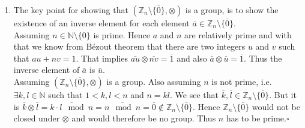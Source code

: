 \documentclass[solution]{tudexercise}
\newcommand{\qed}{\hspace*{\fill}$\square$}
\begin{document}
\begin{enumerate}
				\item
				The key point for showing that $(\mathbb{Z}_n \setminus \{\overline{0}\}, \otimes)$ is a group, is to show the existence of an inverse element for each element $\overline{a} \in \mathbb{Z}_n \setminus \{\overline{0}\}$.\\
				Assuming $n \in \mathbb{N} \setminus \{0\}$ is prime. Hence $a$ and $n$ are relatively prime and with that we know from Bézout theorem that there are two integers $u$ and $v$ such that $au + nv = 1$. That implies $\overline{au} \otimes \overline{nv} = \overline{1}$ and also $\overline{a} \otimes \overline{u} = \overline{1}$. Thus the inverse element of $\overline{a}$ is $\overline{u}$.\\
				Assuming $(\mathbb{Z}_n \setminus \{\overline{0}\}, \otimes)$ is a group. Also assuming $n$ is not prime, i.e. $\exists k, l \in \mathbb{N}$ such that $1 < k, l < n$ and $n = kl$. We see that $\overline{k}, \overline{l} \in \mathbb{Z}_n \setminus \{\overline{0}\}$. But it is $\overline{k} \otimes \overline{l} = \overline{k \cdot l \mod n} = \overline{n \mod n} = \overline{0} \notin \mathbb{Z}_n \setminus \{\overline{0}\}$. Hence $\mathbb{Z}_n \setminus \{\overline{0}\}$ would not be closed under $\otimes$ and would therefore be no group. Thus $n$ has to be prime.\qed
				\end{enumerate}
			
\end{document}
